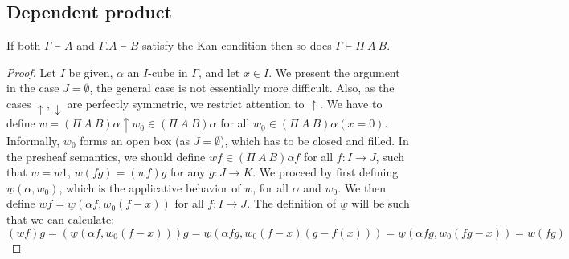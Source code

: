 \documentclass[10pt,a4paper]{article}
\newcommand{\es}{\emptyset}
\newcommand{\rup}[1]{#1{\uparrow}}
\newcommand{\rdo}[1]{#1{\downarrow}}
\newcommand{\ul}[1]{\underline{#1}}
\begin{document}
\subsection{Dependent product}

\begin{theorem}
  If both $\Gamma\vdash A$ and $\Gamma.A\vdash B$ satisfy the Kan
  condition then so does $\Gamma\vdash\Pi~A~B$.
\end{theorem}

\begin{proof}
  Let $I$ be given, $\alpha$ an $I$-cube in $\Gamma$, and let $x\in
  I$.  We present the argument in the case $J=\es$, the general case
  is not essentially more difficult.  Also, as the cases
  $\rup{},\rdo{}$ are perfectly symmetric, we restrict attention to
  $\rup{}$.  We have to define $w=\rup{(\Pi~A~B)\alpha} w_0 \in
  (\Pi~A~B)\alpha$ for all $w_0 \in (\Pi~A~B)\alpha(x=0)$.
  Informally, $w_0$ forms an open box (as $J=\es$), which has to be
  closed and filled.  In the presheaf semantics, we should define
  $wf\in(\Pi~A~B)\alpha f$ for all $f:I\to J$, such that $w=w1$,
  $w(fg) = (wf)g$ for any $g:J\to K$.  We proceed by first defining
  $\ul{w}(\alpha,w_0)$, which is the applicative behavior of $w$, for
  all $\alpha$ and $w_0$.  We then define $wf=\ul{w}(\alpha
  f,w_0(f-x))$ for all $f:I\to J$.  The definition of $\ul{w}$ will be
  such that we can calculate:
  \[
  (wf)g = (\ul{w}(\alpha f,w_0(f-x)))g = \ul{w}(\alpha
  fg,w_0(f-x)(g-f(x))) = \ul{w}(\alpha fg,w_0(fg-x)) = w(fg)
  \]


\end{proof}
\end{document}
